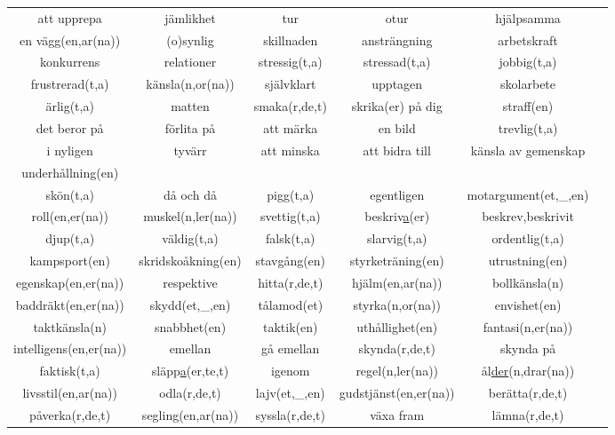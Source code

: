 \begin{center}
    \begin{adjustwidth}{-2.2cm}{}
        \begin{tabular}{|c c c c c c|}
            \hline
            att upprepa & jämlikhet & tur & otur & hjälpsamma & \\
            en vägg(en,ar(na)) & (o)synlig & skillnaden & ansträngning & arbetskraft & \\
            konkurrens & relationer & stressig(t,a) & stressad(t,a) & jobbig(t,a) & \\
            frustrerad(t,a) & känsla(n,or(na)) & självklart & upptagen & skolarbete & \\
            ärlig(t,a) & matten & smaka(r,de,t) & skrika(er) på dig & straff(en) & \\
            det beror på & förlita på & att märka & en bild & trevlig(t,a) & \\
            i nyligen & tyvärr & att minska & att bidra till & känsla av gemenskap & \\
            underhållning(en) &  &  &  &  & \\
            skön(t,a) & då och då & pigg(t,a) & egentligen & motargument(et,\_,en) & \\
            roll(en,er(na)) & muskel(n,ler(na)) & svettig(t,a) & beskriv\underline{a}(er) & beskrev,beskrivit & \\
            djup(t,a) & väldig(t,a) & falsk(t,a) & slarvig(t,a) & ordentlig(t,a) & \\
            kampsport(en) & skridskoåkning(en) & stavgång(en) & styrketräning(en) & utrustning(en) & \\
            egenskap(en,er(na)) & respektive & hitta(r,de,t) & hjälm(en,ar(na)) & bollkänsla(n) & \\
            baddräkt(en,er(na)) & skydd(et,\_,en) & tålamod(et) & styrka(n,or(na)) & envishet(en) & \\
            taktkänsla(n) & snabbhet(en) & taktik(en) & uthållighet(en) & fantasi(n,er(na)) & \\
            intelligens(en,er(na)) & emellan & gå emellan & skynda(r,de,t) & skynda på & \\
            faktisk(t,a) & släpp\underline{a}(er,te,t) & igenom & regel(n,ler(na)) & ål\underline{der}(n,drar(na)) & \\
            livsstil(en,ar(na)) & odla(r,de,t) & lajv(et,\_,en) & gudstjänst(en,er(na)) & berätta(r,de,t) & \\
            påverka(r,de,t) & segling(en,ar(na)) & syssla(r,de,t) & växa fram & lämna(r,de,t) & \\

\end{tabular}
\end{adjustwidth}
\end{center}
